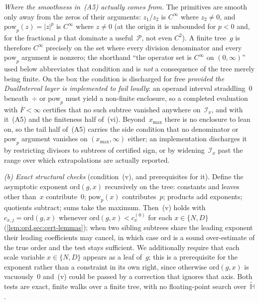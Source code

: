 \documentclass[11pt]{article}
\newcommand{\calI}{\mathcal{I}}
\newcommand{\calP}{\mathcal{P}}
\newcommand{\bbH}{\mathbb{H}}
\theoremstyle{plain}
\theoremstyle{remark}
\begin{document}
\smallskip\noindent
\emph{Where the smoothness in~(A5) actually comes from.}
The primitives are smooth only away from the zeros of their arguments: $z_1/z_2$ is $C^\infty$ where $z_2 \neq 0$, and $\mathrm{pow}_p(z)=|z|^p$ is $C^\infty$ where $z \neq 0$ (at the origin it is unbounded for $p<0$ and, for the fractional $p$ that dominate a useful~$\calP$, not even $C^2$).
A finite tree~$g$ is therefore $C^\infty$ precisely on the set where every division denominator and every $\mathrm{pow}_p$ argument is nonzero; the shorthand ``the operator set is $C^\infty$ on $(0,\infty)$'' used below abbreviates that condition and is \emph{not} a consequence of the tree merely being finite.
On the box the condition is discharged for free \emph{provided the DualInterval layer is implemented to fail loudly}: an operand interval straddling~$0$ beneath~$\div$ or $\mathrm{pow}_p$ must yield a non-finite enclosure, so a completed evaluation with $\overline{F}<\infty$ certifies that no such subtree vanished anywhere on~$\calI_x$, and with it~(A5) and the finiteness half of~(vi).
Beyond~$x_{\max}$ there is no enclosure to lean on, so the tail half of~(A5) carries the side condition that no denominator or $\mathrm{pow}_p$ argument vanishes on $(x_{\max},\infty)$ either; an implementation discharges it by restricting divisors to subtrees of certified sign, or by widening~$\calI_x$ past the range over which extrapolations are actually reported.

\smallskip\noindent
\emph{(b) Exact structural checks} (condition~(v), and prerequisites for it).
Define the asymptotic exponent $\mathrm{ord}(g,x)$ recursively on the tree: constants and leaves other than~$x$ contribute~$0$; $\mathrm{pow}_p(x)$ contributes~$p$; products add exponents; quotients subtract; sums take the maximum.
Then~(v) holds with $c_{x,j} = \mathrm{ord}(g,x)$ whenever $\mathrm{ord}(g,x) < c_x^{(0)}$ for each $x \in \{N,D\}$ (\cref{lem:ord,sec:cert-lemmas}); when two sibling subtrees share the leading exponent their leading coefficients may cancel, in which case $\mathrm{ord}$ is a sound over-estimate of the true order and the test stays sufficient.
We additionally require that each scale variable $x \in \{N,D\}$ appears as a leaf of~$g$; this is a prerequisite for the exponent rather than a constraint in its own right, since otherwise $\mathrm{ord}(g,x)$ is vacuously~$0$ and~(v) could be passed by a correction that ignores that axis.
Both tests are exact, finite walks over a finite tree, with no floating-point search over~$\widetilde{\bbH}$.
\end{document}
